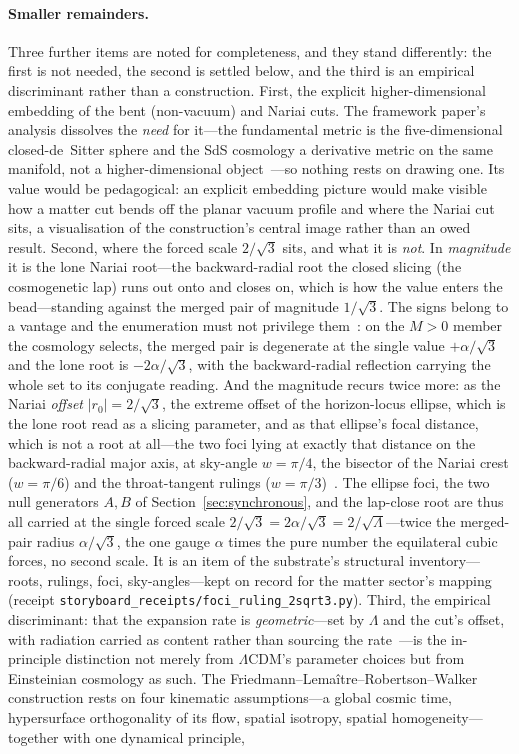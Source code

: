 \documentclass[11pt,a4paper]{article}
\theoremstyle{definition}
\begin{document}
\paragraph{Smaller remainders.} Three further items are noted for completeness, and they stand differently: the first is not needed,
the second is settled below, and the third is an empirical discriminant rather than a construction. First, the explicit higher-dimensional embedding of the bent (non-vacuum) and Nariai cuts. The framework paper's analysis dissolves the \emph{need} for it---the fundamental metric is the five-dimensional closed-de~Sitter sphere and the SdS cosmology a derivative metric on the same manifold, not a higher-dimensional object~\cite{JanzenCRframework, Janzen2015}---so nothing rests on drawing one. Its value would be pedagogical: an explicit embedding picture would make visible how a matter cut bends off the planar vacuum profile and where the Nariai cut sits, a visualisation of the construction's central image rather than an owed result. Second, where the forced scale $2/\sqrt3$ sits, and what it is \emph{not}. In \emph{magnitude} it is the lone Nariai root---the backward-radial root the closed slicing (the cosmogenetic lap) runs out onto and closes on, which is how the value enters the bead---standing against the merged pair of magnitude $1/\sqrt3$. The signs belong to a vantage and the enumeration must not privilege them~\cite{JanzenCircle}: on the $M>0$ member the cosmology selects, the merged pair is degenerate at the single value $+\alpha/\sqrt3$ and the lone root is $-2\alpha/\sqrt3$, with the backward-radial reflection carrying the whole set to its conjugate reading. And the magnitude recurs twice more: as the Nariai \emph{offset} $|r_{0}|=2/\sqrt3$, the extreme offset of the horizon-locus ellipse, which is the lone root read as a slicing parameter, and as that ellipse's focal distance, which is not a root at all---the two foci lying at exactly that distance on the backward-radial major axis, at sky-angle $w=\pi/4$, the bisector of the Nariai crest ($w=\pi/6$) and the throat-tangent rulings ($w=\pi/3$)~\cite{JanzenSlicing}. The ellipse foci, the two null generators $A,B$ of Section~\ref{sec:synchronous}, and the lap-close root are thus all carried at the single forced scale $2/\sqrt3=2\alpha/\sqrt3=2/\sqrt\Lambda$---twice the merged-pair radius $\alpha/\sqrt3$, the one gauge $\alpha$ times the pure number the equilateral cubic forces, no second scale. It is an item of the substrate's structural inventory---roots, rulings, foci, sky-angles---kept on record for the matter sector's mapping (receipt \texttt{storyboard\_receipts/foci\_ruling\_2sqrt3.py}). Third, the empirical discriminant: that the expansion rate is \emph{geometric}---set by $\Lambda$ and the cut's offset, with radiation carried as content rather than sourcing the rate~\cite{JanzenCRframework}---is the in-principle distinction not merely from $\Lambda$CDM's parameter choices but from Einsteinian cosmology as such. The Friedmann--Lema\^itre--Robertson--Walker construction rests on four kinematic assumptions---a global cosmic time, hypersurface orthogonality of its flow, spatial isotropy, spatial homogeneity---together with one dynamical principle, 
\end{document}
